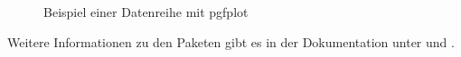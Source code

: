 \begin{figure}[!ht]
    \centering
    \begin{minipage}[t]{0.95\textwidth}
        \centering
        \caption{Beispiel einer Datenreihe mit pgfplot}
        \label{fig:pgfplotsexampledata} %
    \end{minipage}
\end{figure}

\noindent Weitere Informationen zu den Paketen gibt es in der Dokumentation unter \cite{tikz} und \cite{pgfplots}.